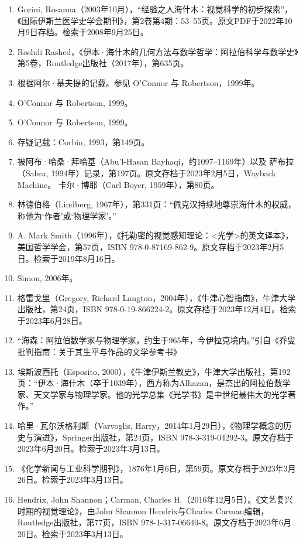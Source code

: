 \begin{enumerate}
\item Gorini, Rosanna（2003年10月），“经验之人海什木：视觉科学的初步探索”，《国际伊斯兰医学史学会期刊》，第2卷第4期：53–55页。原文PDF于2022年10月9日存档。检索于2008年9月25日。
\item Roshdi Rashed，《伊本·海什木的几何方法与数学哲学：阿拉伯科学与数学史》第5卷，Routledge出版社（2017年），第635页。
\item 根据阿尔·基夫提的记载。参见 O'Connor 与 Robertson，1999年。
\item O'Connor 与 Robertson, 1999。
\item O'Connor 与 Robertson, 1999。
\item 存疑记载：Corbin, 1993，第149页。
\item 被阿布·哈桑·拜哈基（Abu'l-Hasan Bayhaqi，约1097–1169年）以及
萨布拉（Sabra, 1994年）记录，第197页。原文存档于2023年2月5日，Wayback Machine。
卡尔·博耶（Carl Boyer, 1959年），第80页。
\item 林德伯格（Lindberg, 1967年），第331页：“佩克汉持续地尊崇海什木的权威，称他为‘作者’或‘物理学家’。”
\item A. Mark Smith（1996年），《托勒密的视觉感知理论：<光学>的英文译本》，美国哲学学会，第57页，ISBN 978-0-87169-862-9。原文存档于2023年2月5日。检索于2019年8月16日。
\item Simon, 2006年。
\item 格雷戈里（Gregory, Richard Langton，2004年），《牛津心智指南》，牛津大学出版社，第24页，ISBN 978-0-19-866224-2。原文存档于2023年12月4日。检索于2023年6月28日。
\item “海森：阿拉伯数学家与物理学家，约生于965年，今伊拉克境内。”引自《乔叟批判指南：关于其生平与作品的文学参考书》
\item 埃斯波西托（Esposito, 2000），《牛津伊斯兰教史》，牛津大学出版社，第192页：“伊本·海什木（卒于1039年），西方称为Alhazan，是杰出的阿拉伯数学家、天文学家与物理学家。他的光学总集《光学书》是中世纪最伟大的光学著作。”
\item 哈里·瓦尔沃格利斯（Varvoglis, Harry，2014年1月29日），《物理学概念的历史与演进》，Springer出版社，第24页，ISBN 978-3-319-04292-3。原文存档于2023年6月20日。检索于2023年3月13日。
\item 《化学新闻与工业科学期刊》，1876年1月6日，第59页。原文存档于2023年3月26日。检索于2023年3月13日。
\item Hendrix, John Shannon；Carman, Charles H.（2016年12月5日）。《文艺复兴时期的视觉理论》，由John Shannon Hendrix与Charles Carman编辑，Routledge出版社，第77页，ISBN 978-1-317-06640-8。原文存档于2023年6月20日。检索于2023年3月13日。

\end{enumerate}
